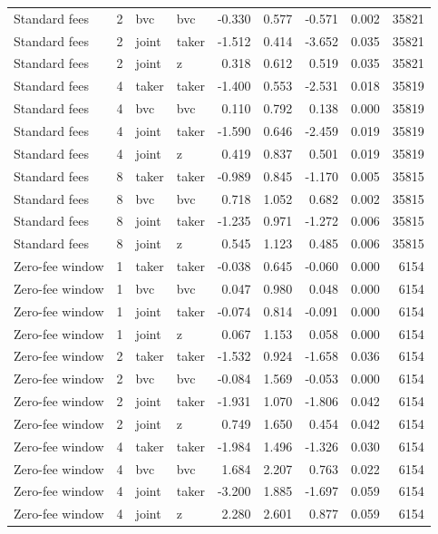 \begin{tabular}{lrllrrrrr}
Standard fees & 2 & bvc & bvc & -0.330 & 0.577 & -0.571 & 0.002 & 35821 \\
Standard fees & 2 & joint & taker & -1.512 & 0.414 & -3.652 & 0.035 & 35821 \\
Standard fees & 2 & joint & z & 0.318 & 0.612 & 0.519 & 0.035 & 35821 \\
Standard fees & 4 & taker & taker & -1.400 & 0.553 & -2.531 & 0.018 & 35819 \\
Standard fees & 4 & bvc & bvc & 0.110 & 0.792 & 0.138 & 0.000 & 35819 \\
Standard fees & 4 & joint & taker & -1.590 & 0.646 & -2.459 & 0.019 & 35819 \\
Standard fees & 4 & joint & z & 0.419 & 0.837 & 0.501 & 0.019 & 35819 \\
Standard fees & 8 & taker & taker & -0.989 & 0.845 & -1.170 & 0.005 & 35815 \\
Standard fees & 8 & bvc & bvc & 0.718 & 1.052 & 0.682 & 0.002 & 35815 \\
Standard fees & 8 & joint & taker & -1.235 & 0.971 & -1.272 & 0.006 & 35815 \\
Standard fees & 8 & joint & z & 0.545 & 1.123 & 0.485 & 0.006 & 35815 \\
Zero-fee window & 1 & taker & taker & -0.038 & 0.645 & -0.060 & 0.000 & 6154 \\
Zero-fee window & 1 & bvc & bvc & 0.047 & 0.980 & 0.048 & 0.000 & 6154 \\
Zero-fee window & 1 & joint & taker & -0.074 & 0.814 & -0.091 & 0.000 & 6154 \\
Zero-fee window & 1 & joint & z & 0.067 & 1.153 & 0.058 & 0.000 & 6154 \\
Zero-fee window & 2 & taker & taker & -1.532 & 0.924 & -1.658 & 0.036 & 6154 \\
Zero-fee window & 2 & bvc & bvc & -0.084 & 1.569 & -0.053 & 0.000 & 6154 \\
Zero-fee window & 2 & joint & taker & -1.931 & 1.070 & -1.806 & 0.042 & 6154 \\
Zero-fee window & 2 & joint & z & 0.749 & 1.650 & 0.454 & 0.042 & 6154 \\
Zero-fee window & 4 & taker & taker & -1.984 & 1.496 & -1.326 & 0.030 & 6154 \\
Zero-fee window & 4 & bvc & bvc & 1.684 & 2.207 & 0.763 & 0.022 & 6154 \\
Zero-fee window & 4 & joint & taker & -3.200 & 1.885 & -1.697 & 0.059 & 6154 \\
Zero-fee window & 4 & joint & z & 2.280 & 2.601 & 0.877 & 0.059 & 6154 \\

\end{tabular}
